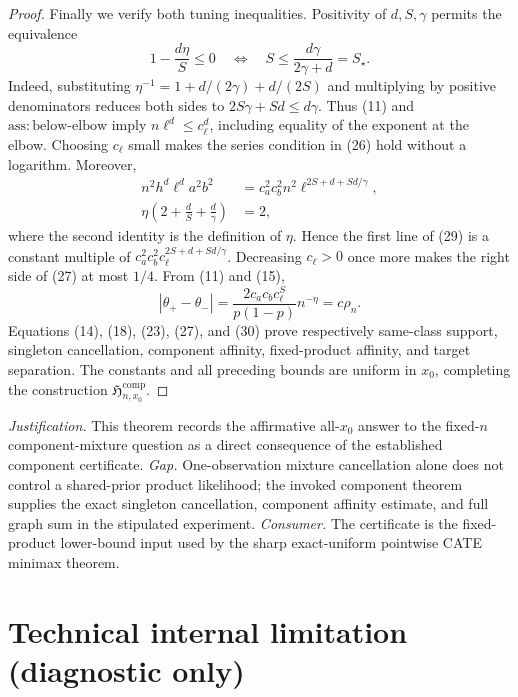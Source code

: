 \documentclass{article}
\begin{document}
\begin{proof}
Finally we verify both tuning inequalities.  Positivity of \(d,S,\gamma\) permits the equivalence
\[
 1-\frac{d\eta}{S}\le0
 \quad\Longleftrightarrow\quad
 S\le\frac{d\gamma}{2\gamma+d}=S_\star.                       \tag{28}
\]
Indeed, substituting \(\eta^{-1}=1+d/(2\gamma)+d/(2S)\) and multiplying by positive denominators reduces both sides to \(2S\gamma+Sd\le d\gamma\).  Thus (11) and \(\mathrm{ass:below\mbox{-}elbow}\) imply \(n\ell^d\le c_\ell^d\), including equality of the exponent at the elbow.  Choosing \(c_\ell\) small makes the series condition in (26) hold without a logarithm.  Moreover,
\[
\begin{aligned}
 n^2h^d\ell^da^2b^2
 &=c_a^2c_b^2n^2\ell^{2S+d+Sd/\gamma},\\
 \eta\left(2+\frac dS+\frac d\gamma\right)&=2,
                                                                    \tag{29}
\end{aligned}
\]
where the second identity is the definition of \(\eta\).  Hence the first line of (29) is a constant multiple of \(c_a^2c_b^2c_\ell^{2S+d+Sd/\gamma}\).  Decreasing \(c_\ell>0\) once more makes the right side of (27) at most \(1/4\).  From (11) and (15),
\[
 |\theta_+-\theta_-|
 =\frac{2c_ac_bc_\ell^S}{p(1-p)}n^{-\eta}
 =c\rho_n.                                                       \tag{30}
\]
Equations (14), (18), (23), (27), and (30) prove respectively same-class support, singleton cancellation, component affinity, fixed-product affinity, and target separation.  The constants and all preceding bounds are uniform in \(x_0\), completing the construction \(\mathfrak H_{n,x_0}^{\mathrm{comp}}\).
\end{proof}
\par\smallskip\noindent \textit{Justification.} This theorem records the affirmative all-\(x_0\) answer to the fixed-\(n\) component-mixture question as a direct consequence of the established component certificate. \textit{Gap.} One-observation mixture cancellation alone does not control a shared-prior product likelihood; the invoked component theorem supplies the exact singleton cancellation, component affinity estimate, and full graph sum in the stipulated experiment. \textit{Consumer.} The certificate is the fixed-product lower-bound input used by the sharp exact-uniform pointwise CATE minimax theorem.

\section*{Technical internal limitation (diagnostic only)}
\end{document}
